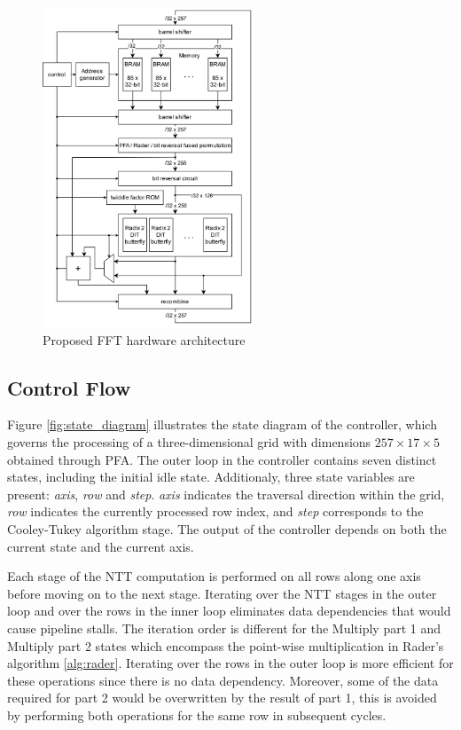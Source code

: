 \documentclass[lettersize,journal]{IEEEtran}
\begin{document}
\begin{figure}[h]
\centering
\includegraphics[width=2.5in]{img/architecture.png}
\caption{Proposed FFT hardware architecture}
\label{fig:hardware_overview}
\end{figure}

\subsection{Control Flow}
Figure \ref{fig:state_diagram} illustrates the state diagram of the controller, which governs the processing of a three-dimensional grid with dimensions $257 \times 17 \times 5$ obtained through PFA. The outer loop in the controller contains seven distinct states, including the initial idle state. Additionaly, three state variables are present: \emph{axis}, \emph{row} and \emph{step}. \emph{axis} indicates the traversal direction within the grid, \emph{row} indicates the currently processed row index, and \emph{step} corresponds to the Cooley-Tukey algorithm stage. The output of the controller depends on both the current state and the current axis.

Each stage of the NTT computation is performed on all rows along one axis before moving on to the next stage. Iterating over the NTT stages in the outer loop and over the rows in the inner loop eliminates data dependencies that would cause pipeline stalls. The iteration order is different for the Multiply part 1 and Multiply part 2 states which encompass the point-wise multiplication in Rader's algorithm \ref{alg:rader}. Iterating over the rows in the outer loop is more efficient for these operations since there is no data dependency. Moreover, some of the data required for part 2 would be overwritten by the result of part 1, this is avoided by performing both operations for the same row in subsequent cycles.
\end{document}
